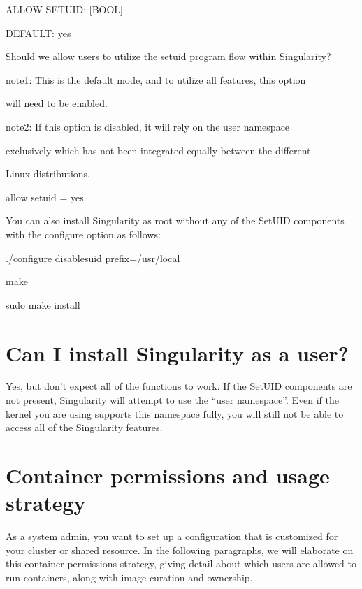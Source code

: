 \documentclass[letterpaper,10pt,english]{sphinxmanual}
\begin{document}
%
\begin{sphinxVerbatim}[commandchars=\\\{\}]
\PYGZsh{} ALLOW SETUID: [BOOL]

\PYGZsh{} DEFAULT: yes

\PYGZsh{} Should we allow users to utilize the setuid program flow within Singularity?

\PYGZsh{} note1: This is the default mode, and to utilize all features, this option

\PYGZsh{} will need to be enabled.

\PYGZsh{} note2: If this option is disabled, it will rely on the user namespace

\PYGZsh{} exclusively which has not been integrated equally between the different

\PYGZsh{} Linux distributions.

allow setuid = yes
\end{sphinxVerbatim}

You can also install Singularity as root without any of the SetUID
components with the configure option  as follows:

%
\begin{sphinxVerbatim}[commandchars=\\\{\}]
\PYGZdl{} ./configure \PYGZhy{}\PYGZhy{}disable\PYGZhy{}suid \PYGZhy{}\PYGZhy{}prefix=/usr/local

\PYGZdl{} make

\PYGZdl{} sudo make install
\end{sphinxVerbatim}


\section{Can I install Singularity as a user?}
\label{\detokenize{security:can-i-install-singularity-as-a-user}}
Yes, but don’t expect all of the functions to work. If the SetUID
components are not present, Singularity will attempt to use the “user
namespace”. Even if the kernel you are using supports this namespace
fully, you will still not be able to access all of the Singularity
features.


\section{Container permissions and usage strategy}
\label{\detokenize{security:container-permissions-and-usage-strategy}}
As a system admin, you want to set up a configuration that is
customized for your cluster or shared resource. In the following
paragraphs, we will elaborate on this container permissions strategy,
giving detail about which users are allowed to run containers, along
with image curation and ownership.
\end{document}
